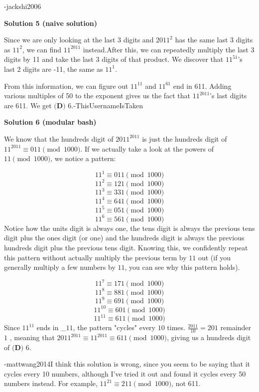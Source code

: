 \begin{enumerate}
 
-jackshi2006

 



\textbf{Solution 5 (naive solution)}

Since we are only looking at the last 3 digits and $2011^2$ has the same last 3 digits as $11^2$, we can find $11^{2011}$ instead.After this, we can repeatedly multiply the last 3 digits by 11 and take the last 3 digits of that product. We discover that $11^{51}$'s last 2 digits are -11, the same as $11^1$. 

 From this information, we can figure out $11^{11}$ and $11^{61}$ end in 611. Adding various multiples of 50 to the exponent gives us the fact that $11^{2011}$'s last digits are 611. We get $\boxed{\textbf{(D) } 6}$.-ThisUsernameIsTaken

 



\textbf{Solution 6 (modular bash)}

We know that the hundreds digit of $2011^{2011}$ is just the hundreds digit of $11^{2011} \equiv 011 \pmod{1000}$. If we actually take a look at the powers of $11 \pmod{1000}$, we notice a pattern:

 
 \[11^{1} \equiv 011 \pmod{1000}\]
 \[11^{2} \equiv 121 \pmod{1000}\]
 \[11^{3} \equiv 331 \pmod{1000}\]
 \[11^{4} \equiv 641 \pmod{1000}\]
 \[11^{5} \equiv 051 \pmod{1000}\]
 \[11^{6} \equiv 561 \pmod{1000}\]Notice how the units digit is always one, the tens digit is always the previous tens digit plus the ones digit (or one) and the hundreds digit is always the previous hundreds digit plus the previous tens digit. Knowing this, we confidently repeat this pattern without actually multiply the previous term by $11$ out (if you generally multiply a few numbers by $11$, you can see why this pattern holds).

 
 \[11^{7} \equiv 171 \pmod{1000}\]
 \[11^{8} \equiv 881 \pmod{1000}\]
 \[11^{9} \equiv 691 \pmod{1000}\]
 \[11^{10} \equiv 601 \pmod{1000}\]
 \[11^{11} \equiv 611 \pmod{1000}\]Since $11^{11}$ ends in \_$11$, the pattern "cycles" every $10$ times. $\frac{2011}{10}=201$ remainder $1$ , meaning that $2011^{2011} \equiv 11^{2011} \equiv 611 \pmod{1000}$, giving us a hundreds digit of $\boxed{\textbf{(D) } 6}$.

 -mattwang2014I think this solution is wrong, since you seem to be saying that it cycles every 10 numbers, although I've tried it out and found it cycles every 50 numbers instead. For example, $11^{21} \equiv 211 \pmod{1000}$, not 611.


\end{enumerate}
